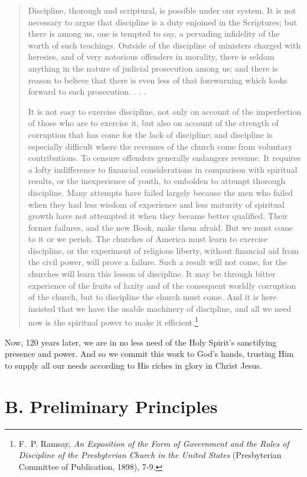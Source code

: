 \documentclass[
]{book}
\begin{document}
\begin{quote}
Discipline, thorough and scriptural, is possible under our system. It is not necessary to argue that discipline is a duty enjoined in the Scriptures; but there is among us, one is tempted to say, a pervading infidelity of the worth of such teachings. Outside of the discipline of ministers charged with heresies, and of very notorious offenders in morality, there is seldom anything in the nature of judicial prosecution among us; and there is reason to believe that there is even less of that forewarning which looks forward to such prosecution. . . .

It is not easy to exercise discipline, not only on account of the imperfection of those who are to exercise it, but also on account of the strength of corruption that has come for the lack of discipline; and discipline is especially difficult where the revenues of the church come from voluntary contributions. To censure offenders generally endangers revenue. It requires a lofty indifference to financial considerations in comparison with spiritual results, or the inexperience of youth, to embolden to attempt thorough discipline. Many attempts have failed largely because the men who failed when they had less wisdom of experience and less maturity of spiritual growth have not attempted it when they became better qualified. Their former failures, and the new Book, make them afraid. But we must come to it or we perish. The churches of America must learn to exercise discipline, or the experiment of religious liberty, without financial aid from the civil power, will prove a failure. Such a result will not come, for the churches will learn this lesson of discipline. It may be through bitter experience of the fruits of laxity and of the consequent worldly corruption of the church, but to discipline the church must come. And it is here insisted that we have the usable machinery of discipline, and all we need now is the spiritual power to make it efficient.\footnote{F.~P. Ramsay, \emph{An Exposition of the Form of Government and the Rules of Discipline of the Presbyterian Church in the United States} (Presbyterian Committee of Publication, 1898), 7-9.}
\end{quote}

Now, 120 years later, we are in no less need of the Holy Spirit's sanctifying presence and power. And so we commit this work to God's hands, trusting Him to supply all our needs according to His riches in glory in Christ Jesus.

\hypertarget{b.-preliminary-principles}{%
\section*{B. Preliminary Principles}\label{b.-preliminary-principles}}
\end{document}
